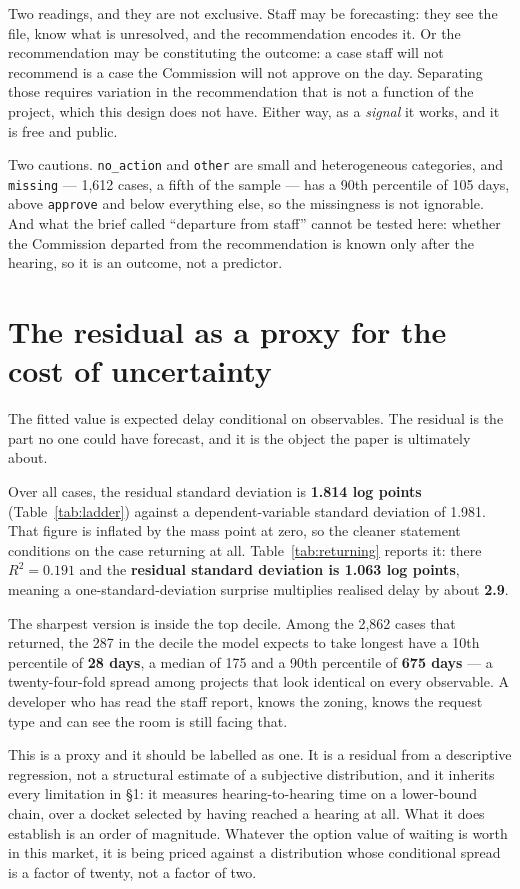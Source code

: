 \documentclass[11pt]{article}
\begin{document}
Two readings, and they are not exclusive. Staff may be forecasting: they see the file, know
what is unresolved, and the recommendation encodes it. Or the recommendation may be
constituting the outcome: a case staff will not recommend is a case the Commission will not
approve on the day. Separating those requires variation in the recommendation that is not a
function of the project, which this design does not have. Either way, as a \emph{signal} it
works, and it is free and public.

Two cautions. \texttt{no\_action} and \texttt{other} are small and heterogeneous categories,
and \texttt{missing} --- 1{,}612 cases, a fifth of the sample --- has a 90th percentile of 105
days, above \texttt{approve} and below everything else, so the missingness is not ignorable.
And what the brief called ``departure from staff'' cannot be tested here: whether the
Commission departed from the recommendation is known only after the hearing, so it is an
outcome, not a predictor.

\section{The residual as a proxy for the cost of uncertainty}
\label{sec:residual}

The fitted value is expected delay conditional on observables. The residual is the part no one
could have forecast, and it is the object the paper is ultimately about.

Over all cases, the residual standard deviation is \textbf{1.814 log points}
(Table~\ref{tab:ladder}) against a dependent-variable standard deviation of 1.981. That figure
is inflated by the mass point at zero, so the cleaner statement conditions on the case
returning at all. Table~\ref{tab:returning} reports it: there $R^2 = 0.191$ and the
\textbf{residual standard deviation is 1.063 log points}, meaning a one-standard-deviation
surprise multiplies realised delay by about \textbf{2.9}.

The sharpest version is inside the top decile. Among the 2{,}862 cases that returned, the 287
in the decile the model expects to take longest have a 10th percentile of \textbf{28 days}, a
median of 175 and a 90th percentile of \textbf{675 days} --- a twenty-four-fold spread among
projects that look identical on every observable. A developer who has read the staff report, knows the zoning, knows the request
type and can see the room is still facing that.

This is a proxy and it should be labelled as one. It is a residual from a descriptive
regression, not a structural estimate of a subjective distribution, and it inherits every
limitation in \S1: it measures hearing-to-hearing time on a lower-bound chain, over a docket
selected by having reached a hearing at all. What it does establish is an order of magnitude.
Whatever the option value of waiting is worth in this market, it is being priced against a
distribution whose conditional spread is a factor of twenty, not a factor of two.
\end{document}
